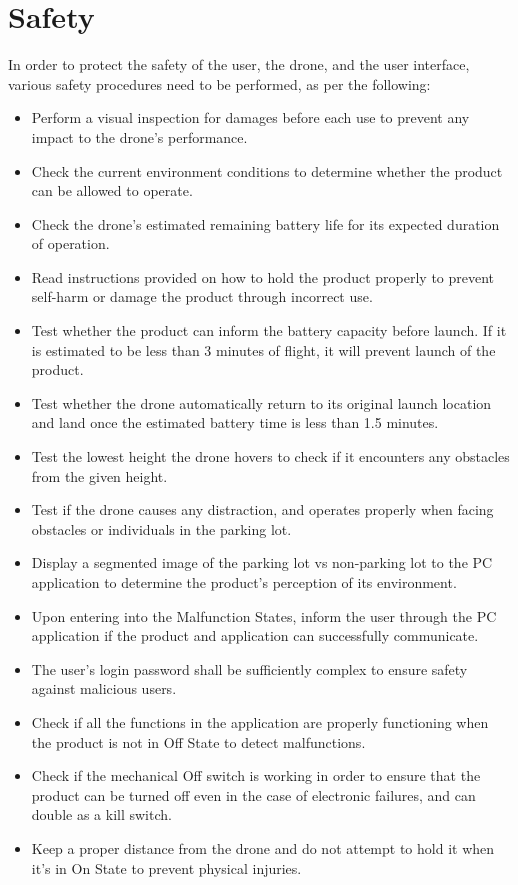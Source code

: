 \documentclass[12pt]{article}
\begin{document}
\section{Safety}
\label{sec:umSafety}

In order to protect the safety of the user, the drone, and the user interface, various safety procedures need to be performed, as per the following:

\begin{itemize}
    \item Perform a visual inspection for damages before each use to prevent any impact to the drone's performance.
    \item Check the current environment conditions to determine whether the product can be allowed to operate.
    \item Check the drone's estimated remaining battery life for its expected duration of operation.
    \item Read instructions provided on how to hold the product properly to prevent self-harm or damage the product through incorrect use.
    \item Test whether the product can inform the battery capacity before launch. If it is estimated to be less than 3 minutes of flight, it will prevent launch of the product.
    \item Test whether the drone automatically return to its original launch location and land once the estimated battery time is less than 1.5 minutes.
    \item Test the lowest height the drone hovers to check if it encounters any obstacles from the given height.
    \item Test if the drone causes any distraction, and operates properly when facing obstacles or individuals in the parking lot.
    \item Display a segmented image of the parking lot vs non-parking lot to the PC application to determine the product’s perception of its environment.
    \item Upon entering into the Malfunction States, inform the user through the PC application if the product and application can successfully communicate.
    \item The user’s login password shall be sufficiently complex to ensure safety against malicious users.
    \item Check if all the functions in the application are properly functioning when the product is not in Off State to detect malfunctions.
    \item Check if the mechanical Off switch is working in order to ensure that the product can be turned off even in the case of electronic failures, and can double as a kill switch.
    \item \color{red} Keep a proper distance from the drone and do not attempt to hold it when it's in On State to prevent physical injuries.
    
\end{itemize}
\end{document}
